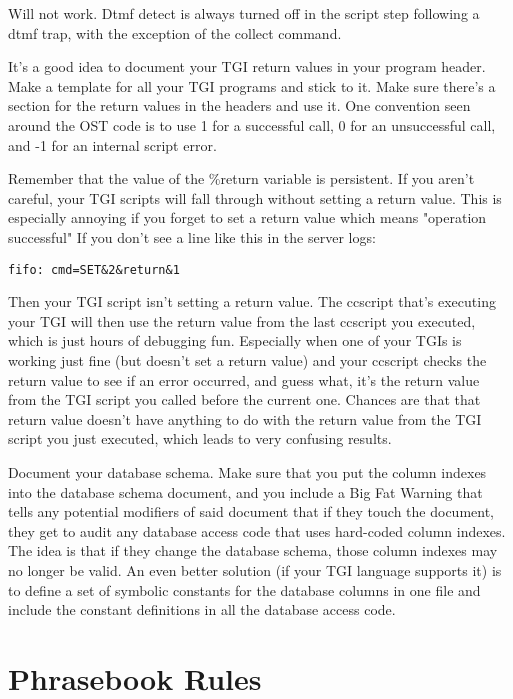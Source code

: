 \documentclass[a4paper,12pt]{article}
\begin{document}
{{{{{{{{Will not work.  Dtmf detect is always turned off in the script step
following a dtmf trap, with the exception of the collect command.

It's a good idea to document your TGI return values in your program
header.  Make a template for all your TGI programs and stick to it.
Make sure there's a section for the return values in the headers and
use it.  One convention seen around the OST code is to use 1 for a
successful call, 0 for an unsuccessful call, and -1 for an internal
script error.

Remember that the value of the \%return variable is persistent.  If you
aren't careful, your TGI scripts will fall through without setting a
return value.  This is especially annoying if you forget to set a
return value which means "operation successful" If you don't see a
line like this in the server logs:

\begin{verbatim}
fifo: cmd=SET&2&return&1
\end{verbatim}

Then your TGI script isn't setting a return value.  The ccscript
that's executing your TGI will then use the return value from the last
ccscript you executed, which is just hours of debugging fun.
Especially when one of your TGIs is working just fine (but doesn't set
a return value) and your ccscript checks the return value to see if an
error occurred, and guess what, it's the return value from the TGI
script you called before the current one.  Chances are that that
return value doesn't have anything to do with the return value from
the TGI script you just executed, which leads to very confusing
results.

Document your database schema.  Make sure that you put the column
indexes into the database schema document, and you include a Big Fat
Warning that tells any potential modifiers of said document that if
they touch the document, they get to audit any database access code
that uses hard-coded column indexes.  The idea is that if they change
the database schema, those column indexes may no longer be valid.  An
even better solution (if your TGI language supports it) is to define a
set of symbolic constants for the database columns in one file and
include the constant definitions in all the database access code.

\section{Phrasebook Rules}

}}}}}}}}
\end{document}
